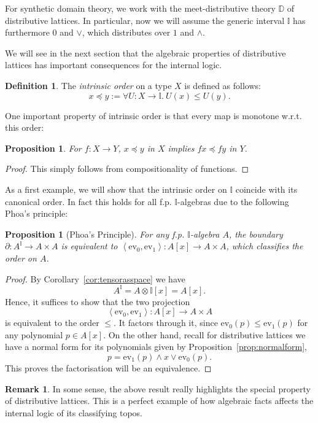 \documentclass[12pt]{amsart}
\newtheorem{proposition}[theorem]{Proposition}
\theoremstyle{definition}
\newtheorem{definition}[theorem]{Definition}
\newtheorem{remark}[theorem]{Remark}
\newcommand{\mbb}[1]{\mathbb{#1}}
\newcommand{\I}{\mbb I}
\newcommand{\pair}[1]{\left\langle#1\right\rangle}
\newcommand{\ev}{\mathrm{ev}}
\newcommand{\fa}[2]{\forall #1\!\colon\!\!#2.\ }
\begin{document}
For synthetic domain theory, we work with the meet-distributive theory $\mbb D$ of distributive lattices. In particular, now we will assume the generic interval $\I$ has furthermore $0$ and $\vee$, which distributes over $1$ and $\wedge$. 

We will see in the next section that the algebraic properties of distributive lattices has important consequences for the internal logic.

\begin{definition}
  The \emph{intrinsic order} on a type $X$ is defined as follows:
  \[ x \preceq y := \fa{U}{X\to\I} U(x) \le U(y). \]
\end{definition}

One important property of intrinsic order is that every map is monotone w.r.t. this order:

\begin{proposition}
  For $f : X \to Y$, $x \preceq y$ in $X$ implies $fx \preceq fy$ in $Y$.
\end{proposition}
\begin{proof}
  This simply follows from compositionality of functions.
\end{proof}

As a first example, we will show that the intrinsic order on $\I$ coincide with its canonical order. In fact this holds for all f.p. $\I$-algebras due to the following Phoa's principle:

\begin{proposition}[Phoa's Principle]\label{prop:phoa}
  For any f.p. $\I$-algebra $A$, the boundary $\partial : A^{\I} \to A \times A$ is equivalent to $\pair{\ev_0,\ev_1} : A[x] \to A \times A$, which classifies the order on $A$.
\end{proposition}
\begin{proof}
  By Corollary~\ref{cor:tensorasspace} we have
  \[ A^\I = A \otimes \I[x] = A[x]. \]
  Hence, it suffices to show that the two projection
  \[ \pair{\ev_0,\ev_1} : A[x] \to A \times A \]
  is equivalent to the order $\le$. It factors through it, since $\ev_0(p) \le \ev_1(p)$ for any polynomial $p\in A[x]$. On the other hand, recall for distributive lattices we have a normal form for its polynomials given by Proposition~\ref{prop:normalform},
  \[ p = \ev_1(p) \wedge x \vee \ev_0(p). \]
  This proves the factorisation will be an equivalence.
\end{proof}

\begin{remark}
  In some sense, the above result really highlights the special property of distributive lattices. This is a perfect example of how algebraic facts affects the internal logic of its classifying topos.
\end{remark}
\end{document}
